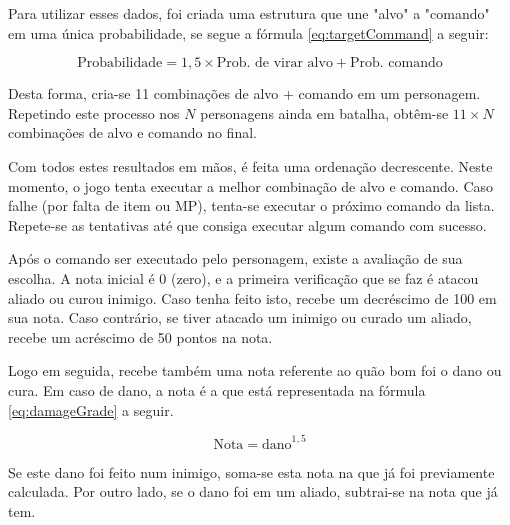 \documentclass[
	12pt,					%
	openright,				%
	oneside,				%
	a4paper,				%
	bibjustif,				%
	chapter=TITLE,			%
	english,				%
	brazil,					%
	]{abntex2}
\begin{document}
	Para utilizar esses dados,
	foi criada uma estrutura que une "alvo"{} a "comando"{} em uma única probabilidade,
	se segue a fórmula \eqref{eq:targetCommand} a seguir:
	
	\begin{equation}
		\textrm{Probabilidade} = 1,5 \times \textrm{Prob. de virar alvo} + \textrm{Prob. comando}
		\label{eq:targetCommand}
	\end{equation}
	
	\vspace{3mm}
	
	Desta forma, cria-se 11 combinações de alvo + comando em um personagem.
	Repetindo este processo nos $N$ personagens ainda em batalha,
	obtêm-se $11 \times N$ combinações de alvo e comando no final.
	
	Com todos estes resultados em mãos,
	é feita uma ordenação decrescente.
	Neste momento,
	o jogo tenta executar a melhor combinação de alvo e comando.
	Caso falhe (por falta de item ou MP),
	tenta-se executar o próximo comando da lista.
	Repete-se as tentativas até que consiga executar algum comando com sucesso.
	
	Após o comando ser executado pelo personagem,
	existe a avaliação de sua escolha.
	A nota inicial é 0 (zero),
	e a primeira verificação que se faz é atacou aliado ou curou inimigo.
	Caso tenha feito isto,
	recebe um decréscimo de 100 em sua nota.
	Caso contrário,
	se tiver atacado um inimigo ou curado um aliado,
	recebe um acréscimo de 50 pontos na nota.
	
	Logo em seguida,
	recebe também uma nota referente ao quão bom foi o dano ou cura.
	Em caso de dano,
	a nota é a que está representada na fórmula \eqref{eq:damageGrade} a seguir.
	
	\begin{equation}
		\textrm{Nota} = \textrm{dano}^{1,5}
		\label{eq:damageGrade}
	\end{equation}
	
	\vspace{3mm}
	
	Se este dano foi feito num inimigo,
	soma-se esta nota na que já foi previamente calculada.
	Por outro lado,
	se o dano foi em um aliado,
	subtrai-se na nota que já tem.
	
\end{document}
